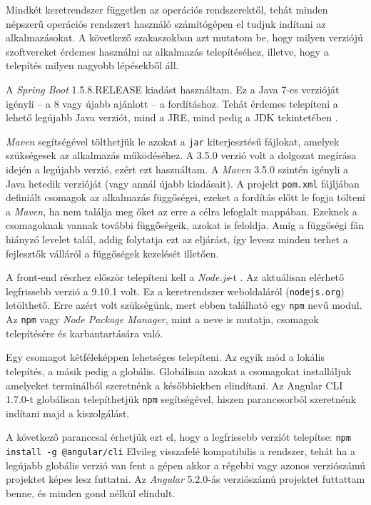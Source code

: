 

Mindkét keretrendszer független az operációs rendszerektől, tehát minden népszerű operációs rendszert használó számítógépen el tudjuk indítani az alkalmazásokat. A következő szakaszokban azt mutatom be, hogy milyen verziójú szoftvereket érdemes használni az alkalmazás telepítéséhez, illetve, hogy a telepítés milyen nagyobb lépésekből áll.


A \textit{Spring Boot} 1.5.8.RELEASE kiadást használtam. Ez a Java 7-es verzióját igényli -- a 8 vagy újabb ajánlott -- a fordításhoz. Tehát érdemes telepíteni a lehető legújabb Java verziót, mind a JRE, mind pedig a JDK tekintetében \cite{23}.

\textit{Maven} segítségével tölthetjük le azokat a \texttt{jar} kiterjesztésű fájlokat, amelyek szükségesek az alkalmazás működéséhez. A 3.5.0 verzió volt a dolgozat megírása idején a legújabb verzió, ezért ezt használtam. A \textit{Maven} 3.5.0 szintén igényli a Java hetedik verzióját (vagy annál újabb kiadásait). A projekt \texttt{pom.xml} fájljában definiált csomagok az alkalmazás függőségei, ezeket a fordítás előtt le fogja tölteni a \textit{Maven}, ha nem találja meg őket az erre a célra lefoglalt mappában. Ezeknek a csomagoknak vannak további függőségeik, azokat is feloldja. Amíg a függőségi fán hiányzó levelet talál, addig folytatja ezt az eljárást, így levesz minden terhet a fejlesztők válláról a függőségek kezelését illetően.


A front-end részhez először telepíteni kell a \textit{Node.js}-t \cite{31}. Az aktuálisan elérhető legfrissebb verzió a 9.10.1 volt. Ez a keretrendszer weboldaláról (\texttt{nodejs.org}) letölthető. Erre azért volt szükségünk, mert ebben található egy \texttt{npm} nevű modul. Az \texttt{npm} vagy \textit{Node Package Manager}, mint a neve is mutatja, csomagok telepítésére és karbantartására való.

Egy csomagot kétféleképpen lehetséges telepíteni. Az egyik mód a lokális telepítés, a másik pedig a globális. Globálisan azokat a csomagokat installáljuk amelyeket terminálból szeretnénk a későbbiekben elindítani.
Az Angular CLI 1.7.0-t globálisan telepíthetjük \texttt{npm} segítségével, hiszen parancssorból szeretnénk indítani majd a kiszolgálást.

A következő paranccsal érhetjük ezt el, hogy a legfrissebb verziót telepítse: \texttt{npm install -g @angular/cli}
Elvileg visszafelé kompatibilis a rendszer, tehát ha a legújabb globális verzió van fent a gépen akkor a régebbi vagy azonos verziószámú projektet képes lesz futtatni. Az \textit{Angular} 5.2.0-ás verziószámú projektet futtattam benne, és minden gond nélkül elindult.

